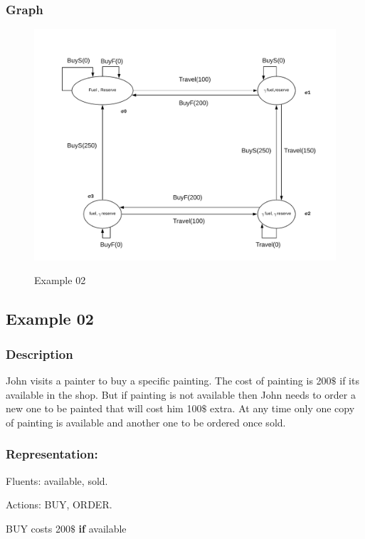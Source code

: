 \documentclass[11pt]{article}
\begin{document}
	\subsubsection{Graph}\label{par:p401}
	\begin{figure}[H]
		\includegraphics[width=1\linewidth, height=0.3\textheight]{./media/ex01.png}
		\label{Figure:f01}
		\caption{Example 02}
	\end{figure}
	\subsection{Example 02}\label{example:ex02}
	\subsubsection{Description}\label{par:p102}
	John visits a painter to buy a specific painting. The cost of painting is 200$\$$  if its available in the shop. But if painting is not available then John needs to order a new one to be painted that will cost him 100$\$$  extra. At any time only one copy of painting is available and another one to be ordered once sold.
	
	\subsubsection{Representation:}\label{par:p202}
	\indent 
	\par Fluents: available, sold.\par
	Actions: BUY, ORDER.\par
	BUY costs 200$\$$  \textbf{if} available\par
	
\end{document}
